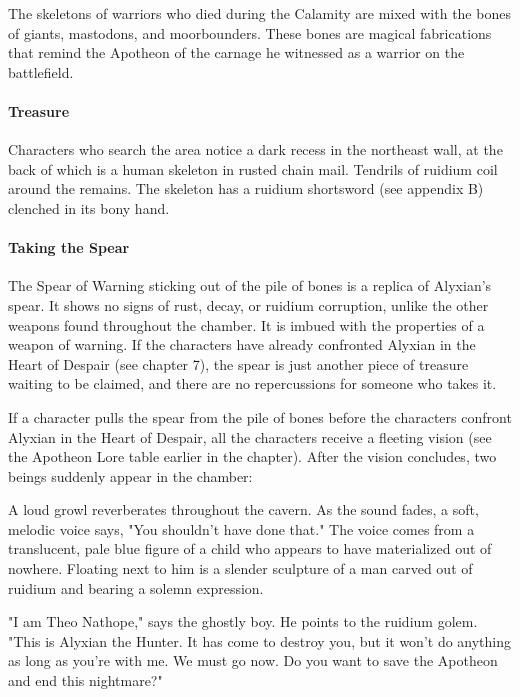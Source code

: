 \documentclass[10pt,a4paper,twoside,twocolumn,openany,nodeprecatedcode]{dndbook}
\begin{document}
The skeletons of warriors who died during the Calamity are mixed with the bones of giants, mastodons, and moorbounders. These bones are magical fabrications that remind the Apotheon of the carnage he witnessed as a warrior on the battlefield.

\paragraph{Treasure}
Characters who search the area notice a dark recess in the northeast wall, at the back of which is a human skeleton in rusted chain mail. Tendrils of ruidium coil around the remains. The skeleton has a ruidium shortsword (see appendix B) clenched in its bony hand.

\paragraph{Taking the Spear}
The Spear of Warning sticking out of the pile of bones is a replica of Alyxian's spear. It shows no signs of rust, decay, or ruidium corruption, unlike the other weapons found throughout the chamber. It is imbued with the properties of a weapon of warning. If the characters have already confronted Alyxian in the Heart of Despair (see chapter 7), the spear is just another piece of treasure waiting to be claimed, and there are no repercussions for someone who takes it.

If a character pulls the spear from the pile of bones before the characters confront Alyxian in the Heart of Despair, all the characters receive a fleeting vision (see the Apotheon Lore table earlier in the chapter). After the vision concludes, two beings suddenly appear in the chamber:

\begin{DndReadAloud}{}
A loud growl reverberates throughout the cavern. As the sound fades, a soft, melodic voice says, "You shouldn't have done that." The voice comes from a translucent, pale blue figure of a child who appears to have materialized out of nowhere. Floating next to him is a slender sculpture of a man carved out of ruidium and bearing a solemn expression.

"I am Theo Nathope," says the ghostly boy. He points to the ruidium golem. "This is Alyxian the Hunter. It has come to destroy you, but it won't do anything as long as you're with me. We must go now. Do you want to save the Apotheon and end this nightmare?"

\end{DndReadAloud}
\end{document}
